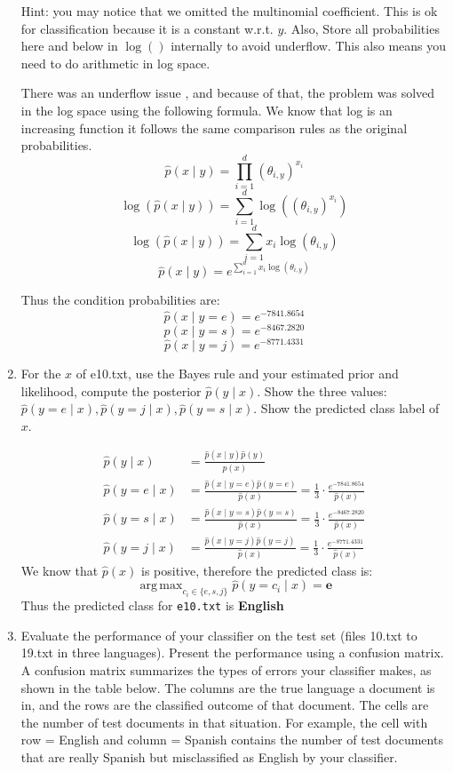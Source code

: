 \documentclass[a4paper]{article}
\theoremstyle{definition}
\DeclareMathOperator*{\argmax}{arg\,max}
\newenvironment{soln}{
    \leavevmode\color{blue}\ignorespaces
}{}
\begin{document}
\begin{enumerate}
Hint: you may notice that we omitted the multinomial coefficient.  This is ok for classification because it is a constant w.r.t. $y$. Also, Store all probabilities here and below in $\log()$ internally to avoid underflow. This also means you need to do arithmetic in log space. \\
\begin{soln}
    There was an underflow issue , and because of that, the problem was solved in the log space using the following formula. We know that log is an increasing function it follows the same comparison rules as the original probabilities.
    $$
        \hat p(x \mid y) = \prod_{i=1}^d (\theta_{i, y})^{x_i}
        $$
        $$
        \log(\hat p(x \mid y)) = \sum_{i=1}^d\log((\theta_{i, y})^{x_i})
        $$
        $$
        \log(\hat p(x \mid y)) = \sum_{i=1}^d x_i\log(\theta_{i, y})
        $$
        $$
        \hat p(x \mid y) = e^{\sum_{i=1}^d x_i\log(\theta_{i, y})}
    $$
    
    Thus the condition probabilities are:
    $$
        \hat p(x \mid y=e) = e^{-7841.8654}
        $$
        $$
        \hat p(x \mid y=s) = e^{-8467.2820}
        $$
        $$
        \hat p(x \mid y=j) = e^{-8771.4331}
    $$
\end{soln}

\item
For the $x$ of e10.txt, use the Bayes rule and your estimated prior and likelihood, compute the posterior $\hat p(y \mid x)$.
Show the three values: $\hat p(y=e \mid x), \hat p(y=j \mid x), \hat p(y=s \mid x)$.
Show the predicted class label of $x$.
\begin{soln}
    \begin{align*}
        \hat p(y \mid x) &= \frac{\hat p(x \mid y) \hat p(y)}{\hat p(x)} \\
        \hat p(y=e \mid x) &= \frac{\hat p(x \mid y=e) \hat p(y=e)}{\hat p(x)} = \frac{1}{3}\cdot\frac{e^{-7841.8654}}{\hat p(x)}\\
        \hat p(y=s \mid x) &= \frac{\hat p(x \mid y=s) \hat p(y=s)}{\hat p(x)} = \frac{1}{3}\cdot\frac{e^{-8467.2820}}{\hat p(x)}\\
        \hat p(y=j \mid x) &= \frac{\hat p(x \mid y=j) \hat p(y=j)}{\hat p(x)} = \frac{1}{3}\cdot\frac{e^{-8771.4331}}{\hat p(x)}
    \end{align*}
    We know that $\hat p(x)$ is positive, therefore the predicted class is: 
    $$
    \argmax_{c_i\in\{e,s,j\}} \hat p(y=c_i \mid x) = \mathbf{e}
    $$
    Thus the predicted class for \texttt{e10.txt} is \textbf{English}
\end{soln}
\item
Evaluate the performance of your classifier on the test set (files 10.txt to 19.txt in three languages).
Present the performance using a confusion matrix. A confusion matrix summarizes the types of errors your classifier makes, as shown in the table below.   The columns are the true language a document is in, and the rows are the classified outcome of that document.  The cells are the number of test documents in that situation.  For example, the cell with row = English and column = Spanish contains the number of test documents that are really Spanish but misclassified as English by your classifier.


\end{enumerate}
\end{document}
